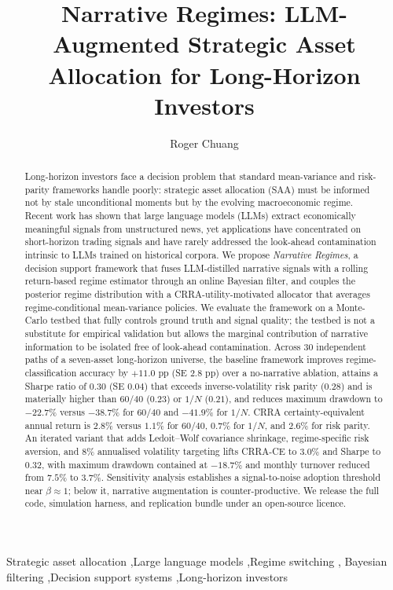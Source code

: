 \documentclass[review,12pt,authoryear]{elsarticle}
\begin{document}
\begin{frontmatter}

\title{Narrative Regimes: LLM-Augmented Strategic Asset Allocation for Long-Horizon Investors}

\author[a]{Roger Chuang}

\address[a]{Independent Researcher, Taipei, Taiwan}

\begin{abstract}
Long-horizon investors face a decision problem that standard mean-variance and risk-parity
frameworks handle poorly: strategic asset allocation (SAA) must be informed not by stale
unconditional moments but by the evolving macroeconomic regime. Recent work has shown that
large language models (LLMs) extract economically meaningful signals from unstructured news,
yet applications have concentrated on short-horizon trading signals and have rarely addressed
the look-ahead contamination intrinsic to LLMs trained on historical corpora. We propose
\emph{Narrative Regimes}, a decision support framework that fuses LLM-distilled narrative
signals with a rolling return-based regime estimator through an online Bayesian filter, and
couples the posterior regime distribution with a CRRA-utility-motivated allocator that
averages regime-conditional mean-variance policies. We evaluate the framework on a
Monte-Carlo testbed that fully controls ground truth and signal quality; the testbed is not
a substitute for empirical validation but allows the marginal contribution of narrative
information to be isolated free of look-ahead contamination. Across 30 independent paths of a
seven-asset long-horizon universe, the baseline framework improves regime-classification
accuracy by $+11.0$ pp (SE $2.8$ pp) over a no-narrative ablation, attains a Sharpe ratio
of $0.30$ (SE $0.04$) that exceeds inverse-volatility risk parity ($0.28$) and is
materially higher than $60/40$ ($0.23$) or $1/N$ ($0.21$), and reduces maximum drawdown to
$-22.7\%$ versus $-38.7\%$ for $60/40$ and $-41.9\%$ for $1/N$. CRRA certainty-equivalent
annual return is $2.8\%$ versus $1.1\%$ for $60/40$, $0.7\%$ for $1/N$, and $2.6\%$ for
risk parity. An iterated variant that adds Ledoit--Wolf covariance shrinkage, regime-specific
risk aversion, and $8\%$ annualised volatility targeting lifts CRRA-CE to $3.0\%$ and
Sharpe to $0.32$, with maximum drawdown contained at $-18.7\%$ and monthly turnover reduced
from $7.5\%$ to $3.7\%$. Sensitivity analysis
establishes a signal-to-noise adoption threshold near $\beta\approx 1$; below it, narrative
augmentation is counter-productive. We release the full code, simulation harness, and
replication bundle under an open-source licence.
\end{abstract}

\begin{keyword}
Strategic asset allocation \sep Large language models \sep Regime switching \sep
Bayesian filtering \sep Decision support systems \sep Long-horizon investors
\end{keyword}

\end{frontmatter}
\end{document}
